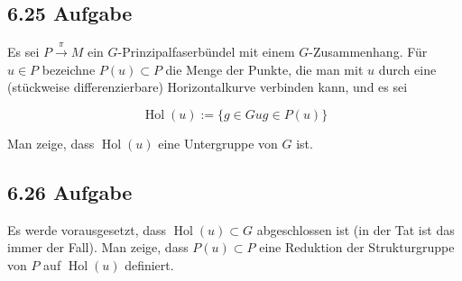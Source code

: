 \documentclass[10pt, letterpaper]{article}
\begin{document}
\subsection*{6.25 Aufgabe}
Es sei $P \xrightarrow{\pi} M$ ein $G$-Prinzipalfaserbündel mit einem $G$-Zusammenhang. Für $u \in P$ bezeichne $P(u) \subset P$ die Menge der Punkte, die man mit $u$ durch eine (stückweise differenzierbare) Horizontalkurve verbinden kann, und es sei

$$
\operatorname{Hol}(u):=\{g \in G u g \in P(u)\}
$$

Man zeige, dass $\operatorname{Hol}(u)$ eine Untergruppe von $G$ ist.

\subsection*{6.26 Aufgabe}
Es werde vorausgesetzt, dass $\operatorname{Hol}(u) \subset G$ abgeschlossen ist (in der Tat ist das immer der Fall). Man zeige, dass $P(u) \subset P$ eine Reduktion der Strukturgruppe von $P$ auf $\operatorname{Hol}(u)$ definiert.
\end{document}
